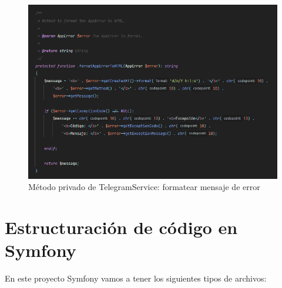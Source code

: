 \begin{figure}[H]
  \centering
  \includegraphics[scale=0.5]{images/telegram-service-2.png}
  \caption{Método privado de TelegramService: formatear mensaje de error}
  \label{}
\end{figure}

\section{Estructuración de código en Symfony}

En este proyecto Symfony vamos a tener los siguientes tipos de archivos:


